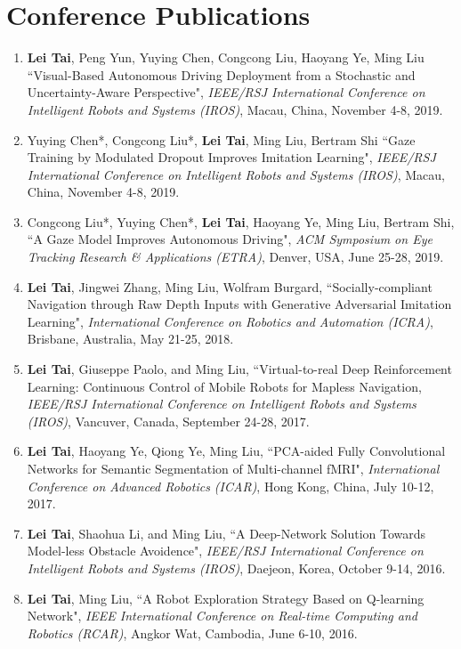 \section*{Conference Publications}
\begin{enumerate}
	\item {\bf Lei Tai}, Peng Yun, Yuying Chen, Congcong Liu, Haoyang Ye, Ming Liu ``Visual-Based Autonomous Driving Deployment from a Stochastic and Uncertainty-Aware Perspective", \emph{IEEE/RSJ International Conference on Intelligent Robots and Systems (IROS)}, Macau, China, November 4-8, 2019.
	\item Yuying Chen*, Congcong Liu*, {\bf Lei Tai}, Ming Liu, Bertram Shi ``Gaze Training by Modulated Dropout Improves Imitation Learning", \emph{IEEE/RSJ International Conference on Intelligent Robots and Systems (IROS)}, Macau, China, November 4-8, 2019.
	\item Congcong Liu*, Yuying Chen*, {\bf Lei Tai}, Haoyang Ye, Ming Liu, Bertram Shi, ``A Gaze Model Improves Autonomous Driving", \emph{ACM Symposium on Eye Tracking Research \& Applications (ETRA)}, Denver, USA, June 25-28, 2019.
	\item {\bf Lei Tai}, Jingwei Zhang, Ming Liu, Wolfram Burgard, ``Socially-compliant Navigation through Raw Depth Inputs with Generative Adversarial Imitation Learning", \emph{International Conference on Robotics and Automation (ICRA)}, Brisbane, Australia, May 21-25, 2018.
	\item {\bf Lei Tai}, Giuseppe Paolo, and Ming Liu, ``Virtual-to-real Deep Reinforcement Learning: Continuous Control of Mobile Robots for Mapless Navigation, \emph{IEEE/RSJ International Conference on Intelligent Robots and Systems (IROS)}, Vancuver, Canada, September 24-28, 2017.
	\item {\bf Lei Tai}, Haoyang Ye, Qiong Ye, Ming Liu, ``PCA-aided Fully Convolutional Networks for Semantic Segmentation of Multi-channel fMRI", \emph{International Conference on Advanced Robotics (ICAR)}, Hong Kong, China, July 10-12, 2017.
  \item {\bf Lei Tai}, Shaohua Li, and Ming Liu, ``A Deep-Network Solution Towards Model-less Obstacle Avoidence", \emph{IEEE/RSJ International Conference on Intelligent Robots and Systems (IROS)}, Daejeon, Korea, October 9-14, 2016.
  \item {\bf Lei Tai}, Ming Liu, ``A Robot Exploration Strategy Based on Q-learning Network", \emph{IEEE International Conference on Real-time Computing and Robotics (RCAR)}, Angkor Wat, Cambodia, June 6-10, 2016.
\end{enumerate}
